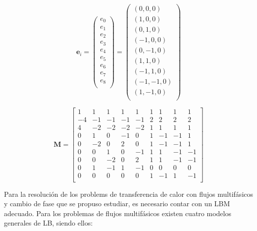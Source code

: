 \begin{equation}
{\mathbf{e}_{i}} =  
\left( \begin{array}{c} 
e_{0} \\ e_{1}\\ e_{2}\\ e_{3}\\ e_{4}\\ e_{5}\\
e_{6}\\ e_{7}\\ e_{8}\\
\end{array}
\right) =
\left( \begin{array}{c} 
( 0, 0, 0) \\ ( 1, 0, 0) \\ ( 0, 1, 0) \\(-1, 0, 0) \\ ( 0,-1, 0) \\ ( 1, 1, 0) \\
(-1, 1, 0) \\ (-1,-1, 0) \\ ( 1,-1, 0)\\ 
\end{array}
\right) 
\label{eq:velgrilla}
\end{equation}

\begin{equation}
\mathbf{M} =
\begin{bmatrix}
1 & 1 & 1 & 1 & 1 & 1 & 1 & 1 & 1 \\
-4 &-1 &-1 &-1 &-1 & 2 & 2 & 2 & 2 \\
4 &-2 &-2 &-2 &-2 & 1 & 1 & 1 & 1 \\
0 & 1 & 0 &-1 & 0 & 1 &-1 &-1 & 1 \\
0 &-2 & 0 & 2 & 0 & 1 &-1 &-1 & 1 \\
0 & 0 & 1 & 0 &-1 & 1 & 1 &-1 &-1 \\
0 & 0 &-2 & 0 & 2 & 1 & 1 &-1 &-1 \\
0 & 1 &-1 & 1 &-1 & 0 & 0 & 0 & 0 \\    
0 & 0 & 0 & 0 & 0 & 1 &-1 & 1 &-1 \\        
\end{bmatrix}
\label{eq:matriz_m}
\end{equation}

Para la resolución de los problems de transferencia de calor con flujos multifásicos y cambio de fase que se propuso estudiar, es necesario contar con un LBM adecuado. Para los problemas de flujos multifásicos existen cuatro modelos generales de LB, siendo ellos:

